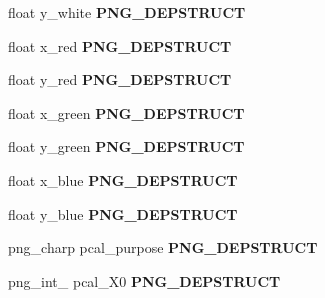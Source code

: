 \begin{DoxyCompactItemize}
\item 
\hypertarget{structpng__info__struct_a1e71c34d319cd110c6b4c200655fbcb6}{float y\-\_\-white {\bfseries P\-N\-G\-\_\-\-D\-E\-P\-S\-T\-R\-U\-C\-T}}\label{structpng__info__struct_a1e71c34d319cd110c6b4c200655fbcb6}

\item 
\hypertarget{structpng__info__struct_a689d458c150c4b475876d4779a7434cc}{float x\-\_\-red {\bfseries P\-N\-G\-\_\-\-D\-E\-P\-S\-T\-R\-U\-C\-T}}\label{structpng__info__struct_a689d458c150c4b475876d4779a7434cc}

\item 
\hypertarget{structpng__info__struct_a8a345408720e441070871fce9ebc703a}{float y\-\_\-red {\bfseries P\-N\-G\-\_\-\-D\-E\-P\-S\-T\-R\-U\-C\-T}}\label{structpng__info__struct_a8a345408720e441070871fce9ebc703a}

\item 
\hypertarget{structpng__info__struct_a8c07cf0d15c911d75f7959a69ca0c451}{float x\-\_\-green {\bfseries P\-N\-G\-\_\-\-D\-E\-P\-S\-T\-R\-U\-C\-T}}\label{structpng__info__struct_a8c07cf0d15c911d75f7959a69ca0c451}

\item 
\hypertarget{structpng__info__struct_a70e2c9e98b55530ea4c9b548da0fae6a}{float y\-\_\-green {\bfseries P\-N\-G\-\_\-\-D\-E\-P\-S\-T\-R\-U\-C\-T}}\label{structpng__info__struct_a70e2c9e98b55530ea4c9b548da0fae6a}

\item 
\hypertarget{structpng__info__struct_a9bd9a4ee6fd891c203af5aeb1e00f8da}{float x\-\_\-blue {\bfseries P\-N\-G\-\_\-\-D\-E\-P\-S\-T\-R\-U\-C\-T}}\label{structpng__info__struct_a9bd9a4ee6fd891c203af5aeb1e00f8da}

\item 
\hypertarget{structpng__info__struct_ad4bd797dc49d35b59a16f3e483052e73}{float y\-\_\-blue {\bfseries P\-N\-G\-\_\-\-D\-E\-P\-S\-T\-R\-U\-C\-T}}\label{structpng__info__struct_ad4bd797dc49d35b59a16f3e483052e73}

\item 
\hypertarget{structpng__info__struct_a897b74a81f216922a9f74adc350c8680}{png\-\_\-charp pcal\-\_\-purpose {\bfseries P\-N\-G\-\_\-\-D\-E\-P\-S\-T\-R\-U\-C\-T}}\label{structpng__info__struct_a897b74a81f216922a9f74adc350c8680}

\item 
\hypertarget{structpng__info__struct_a804b2c2fdc78a14a2d71eb4d7a331c2a}{png\-\_\-int\-\_ pcal\-\_\-\-X0 {\bfseries P\-N\-G\-\_\-\-D\-E\-P\-S\-T\-R\-U\-C\-T}}\label{structpng__info__struct_a804b2c2fdc78a14a2d71eb4d7a331c2a}


\end{DoxyCompactItemize}
